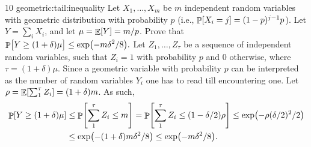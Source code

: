 %
{10}%
{geometric:tail:inequality}{%
   Let $X_1, \ldots, X_m$ be $m$ independent random variables with
   geometric distribution with probability $p$ (i.e., $\Prob{X_i = j}
   = (1-p)^{j-1} p$). Let $Y = \sum_{i} X_i$, and let $\mu = \mathop{\mathbb{E}}\!\left[ {Y} \right] =
   m/p$. Prove that
   \begin{math}
       \ds \Prob{\bigl. Y \geq (1+\delta) \mu \MakesBig }%
       \leq%
       \exp \pth[]{ - \nfrac{m \delta^2}{8}}.
   \end{math}%
}{%
   Let $Z_1, \ldots, Z_\tau$ be a sequence of independent random
   variables, such that $Z_i=1$ with probability $p$ and $0$
   otherwise, where $\tau = (1+\delta) \mu$. Since a geometric
   variable with probability $p$ can be interpreted as the number of
   random variables $Y_i$ one has to read till encountering one. Let
   $\rho = \mathop{\mathbb{E}}\!\left[ {\sum_{1}^{\tau} Z_i} \right] = (1+\delta)m$.  As such,
   \begin{align*}
       \Prob{Y \geq (1+\delta) \mu }%
       &\leq %
       \Prob{\sum_{1}^{\tau} Z_i \leq m}%
       =%
       \Prob{\sum_{1}^{\tau} Z_i \leq (1-\delta/2)\rho }%
       \leq%
       \exp\pth{ - \rho (\delta/2)^2/ 2 }\\
       &\leq%
       \exp\pth{ - (1+\delta)m \delta^2/ 8 }%
       \leq%
       \exp\pth{ -m \delta^2/ 8 }.
   \end{align*}
}


\ChapterEnd{}



